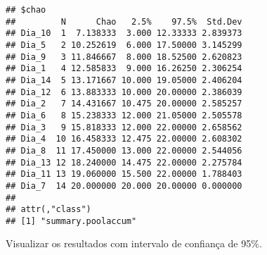 \documentclass[
]{book}
\begin{document}
\begin{verbatim}
## $chao
##         N      Chao   2.5%    97.5%  Std.Dev
## Dia_10  1  7.138333  3.000 12.33333 2.839373
## Dia_5   2 10.252619  6.000 17.50000 3.145299
## Dia_9   3 11.846667  8.000 18.52500 2.620823
## Dia_1   4 12.585833  9.000 16.26250 2.306254
## Dia_14  5 13.171667 10.000 19.05000 2.406204
## Dia_12  6 13.883333 10.000 20.00000 2.386039
## Dia_2   7 14.431667 10.475 20.00000 2.585257
## Dia_6   8 15.238333 12.000 21.05000 2.505578
## Dia_3   9 15.818333 12.000 22.00000 2.658562
## Dia_4  10 16.458333 12.475 22.00000 2.608302
## Dia_8  11 17.450000 13.000 22.00000 2.544056
## Dia_13 12 18.240000 14.475 22.00000 2.275784
## Dia_11 13 19.060000 15.500 22.00000 1.788403
## Dia_7  14 20.000000 20.000 20.00000 0.000000
## 
## attr(,"class")
## [1] "summary.poolaccum"
\end{verbatim}

Visualizar os resultados com intervalo de confiança de 95\%.
\end{document}
